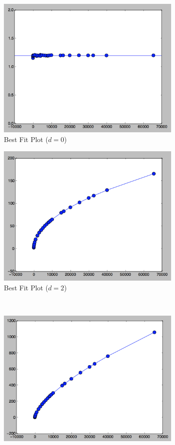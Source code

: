\documentclass[12pt]{article}
\begin{document}
\begin{figure}[h!]
\centering
\begin{subfigure}{.5\textwidth}
  \centering
  \includegraphics[width=0.8\linewidth]{img/d0_fit.png}
  \caption{Best Fit Plot ($d = 0$)}
  \label{fig:sub1}
\end{subfigure}%
\begin{subfigure}{.5\textwidth}
  \centering
  \includegraphics[width=0.8\linewidth]{img/d2_fit.png}
  \caption{Best Fit Plot ($d = 2$)}
  \label{fig:sub2}
\end{subfigure} \\ %
\bigskip
\begin{subfigure}{.5\textwidth}
  \centering
  \includegraphics[width=0.8\linewidth]{img/d3_fit.png}

\end{subfigure}
\end{figure}
\end{document}
